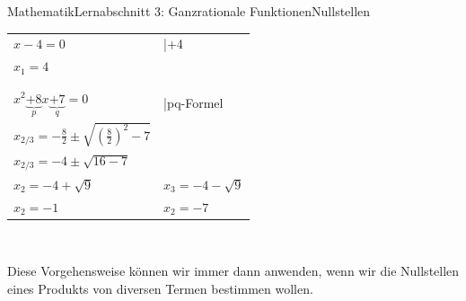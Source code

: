 \documentclass[11pt,twocolumn,oneside,openany,headings=optiontotoc,11pt,numbers=noenddot]{article}
\begin{document}
\begin{worksheet}{Mathematik}{Lernabschnitt 3: Ganzrationale Funktionen}{Nullstellen}
\begin{tabularx}{0.48\textwidth}{Xl}
			\(x-4 = 0\) & |+4\\
			\colorbox{green!10}{\(x_1 = 4\)} &\\
			\\
			\hline
			\\
			\(x^2\underbrace{+8}_{p}x \underbrace{+7}_{q} = 0\) & |pq-Formel\\
			\(x_{2/3}= -\frac{8}{2}\pm\sqrt{\left(\frac{8}{2}\right)^2-7}\)\\
			\(x_{2/3} = -4 \pm \sqrt{16-7}\)\\
			\(x_2 = -4 + \sqrt{9}\) & \(x_3 = -4 - \sqrt{9}\)\\
			\colorbox{green!10}{\(x_2 = -1\)} & \colorbox{green!10}{\(x_2 = -7\)}
		\end{tabularx}\\
		\par\noindent
		Diese Vorgehensweise können wir immer dann anwenden, wenn wir die Nullstellen eines Produkts von diversen Termen bestimmen wollen.

\end{worksheet}
\end{document}

